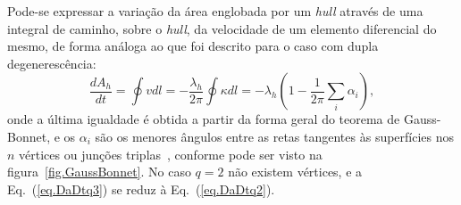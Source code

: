 Pode-se expressar a variação da área englobada por um \textit{hull} através de uma integral de caminho, sobre o \textit{hull}, da velocidade de um elemento diferencial do mesmo, de forma análoga ao que foi descrito para o caso com dupla degenerescência:
\begin{equation}
 \label{eq.DaDtq3}
 \frac{dA_h}{dt} = \oint v dl = -\frac{\lambda_h}{2\pi} \oint \kappa dl = -\lambda_h \left(1-\frac{1}{2\pi}\sum_i\alpha_i \right),
\end{equation}
onde a última igualdade é obtida a partir da forma geral do teorema de Gauss-Bonnet, e os $\alpha_i$ são os menores ângulos entre as retas tangentes às superfícies nos $n$ vértices ou junções triplas~\cite{LoureiroPRE}, conforme pode ser visto na figura~\ref{fig.GaussBonnet}. No caso $q=2$ não existem vértices, e a Eq.~(\ref{eq.DaDtq3}) se reduz à Eq.~(\ref{eq.DaDtq2}).

